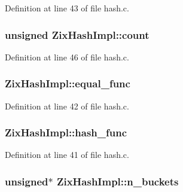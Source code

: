 Definition at line 43 of file hash.\+c.

\subsubsection[{\texorpdfstring{count}{count}}]{\setlength{\rightskip}{0pt plus 5cm}unsigned Zix\+Hash\+Impl\+::count}\hypertarget{struct_zix_hash_impl_a39b61f4305e5aa4d5fffc508a0790c2c}{}\label{struct_zix_hash_impl_a39b61f4305e5aa4d5fffc508a0790c2c}


Definition at line 46 of file hash.\+c.

\subsubsection[{\texorpdfstring{equal\+\_\+func}{equal_func}}]{ Zix\+Hash\+Impl\+::equal\+\_\+func}\hypertarget{struct_zix_hash_impl_a3de67228ddf37247725de59c8c2483cc}{}\label{struct_zix_hash_impl_a3de67228ddf37247725de59c8c2483cc}


Definition at line 42 of file hash.\+c.

\subsubsection[{\texorpdfstring{hash\+\_\+func}{hash_func}}]{ Zix\+Hash\+Impl\+::hash\+\_\+func}\hypertarget{struct_zix_hash_impl_af77da5cd016af1529c9913a6ddd7cac3}{}\label{struct_zix_hash_impl_af77da5cd016af1529c9913a6ddd7cac3}


Definition at line 41 of file hash.\+c.

\subsubsection[{\texorpdfstring{n\+\_\+buckets}{n_buckets}}]{ unsigned$\ast$ Zix\+Hash\+Impl\+::n\+\_\+buckets}\hypertarget{struct_zix_hash_impl_a7ef166f3dcdef84f2decdc956142441b}{}\label{struct_zix_hash_impl_a7ef166f3dcdef84f2decdc956142441b}


